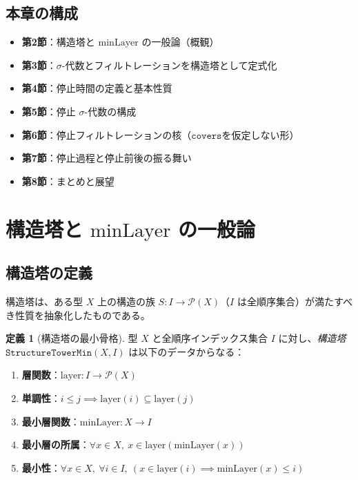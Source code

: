 \documentclass[11pt,a4paper,ja=standard]{ltjsarticle}
\theoremstyle{definition}
\newtheorem{definition}{定義}[section]
\newcommand{\minLayer}{\mathrm{minLayer}}
\newcommand{\layer}{\mathrm{layer}}
\begin{document}
\subsection{本章の構成}

\begin{itemize}[leftmargin=*]
\item \textbf{第2節}：構造塔と $\minLayer$ の一般論（概観）
\item \textbf{第3節}：$\sigma$-代数とフィルトレーションを構造塔として定式化
\item \textbf{第4節}：停止時間の定義と基本性質
\item \textbf{第5節}：停止 $\sigma$-代数の構成
\item \textbf{第6節}：停止フィルトレーションの核（$\mathtt{covers}$を仮定しない形）
\item \textbf{第7節}：停止過程と停止前後の振る舞い
\item \textbf{第8節}：まとめと展望
\end{itemize}

\section{構造塔と $\minLayer$ の一般論}

\subsection{構造塔の定義}

構造塔は、ある型 $X$ 上の構造の族 $S: I \to \mathcal{P}(X)$（$I$ は全順序集合）が満たすべき性質を抽象化したものである。

\begin{definition}[構造塔の最小骨格]\label{def:structure-tower-min}
型 $X$ と全順序インデックス集合 $I$ に対し、\emph{構造塔 $\mathtt{StructureTowerMin}(X, I)$} は以下のデータからなる：
\begin{enumerate}[label=(\roman*)]
\item \textbf{層関数}：$\layer : I \to \mathcal{P}(X)$
\item \textbf{単調性}：$i \le j \implies \layer(i) \subseteq \layer(j)$
\item \textbf{最小層関数}：$\minLayer : X \to I$
\item \textbf{最小層の所属}：$\forall x \in X,\ x \in \layer(\minLayer(x))$
\item \textbf{最小性}：$\forall x \in X,\ \forall i \in I,\ (x \in \layer(i) \implies \minLayer(x) \le i)$
\end{enumerate}
\end{definition}
\end{document}
